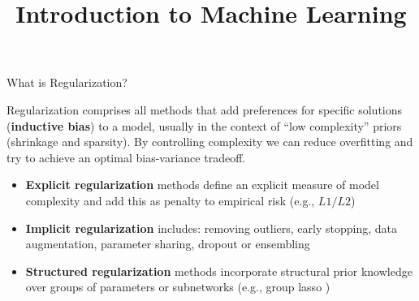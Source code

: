 \documentclass[11pt,compress,t,notes=noshow, xcolor=table]{beamer}
\title{Introduction to Machine Learning}
\begin{document}



\begin{vbframe}{What is Regularization?}

Regularization comprises all methods that add preferences for specific solutions (\textbf{inductive bias}) to a model, usually in the context of ``low complexity'' priors (shrinkage and sparsity). By controlling complexity we can reduce overfitting and try to achieve an optimal bias-variance tradeoff.
\vspace{0.1cm}
\begin{itemize}
\setlength{\itemsep}{1.0em}
    \item \textbf{Explicit regularization} methods define an explicit measure of model complexity and add this as penalty to empirical risk (e.g., $L1/L2$)
    \item \textbf{Implicit regularization} includes: removing outliers, early stopping, data augmentation, parameter sharing, dropout or ensembling
    \item \textbf{Structured regularization} methods incorporate structural prior knowledge over groups of parameters or subnetworks (e.g., group lasso )
\end{itemize}

\end{vbframe}
\end{document}
